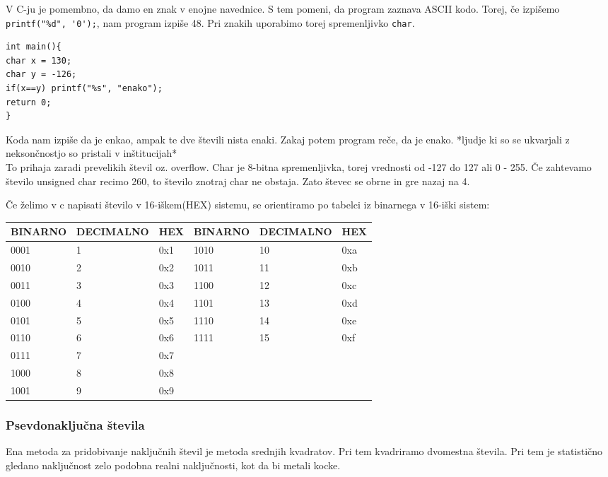 \documentclass[a4paper, 12pt]{article}
\begin{document}
V C-ju je pomembno, da damo en znak v enojne navednice. S tem pomeni, da program zaznava ASCII kodo. Torej, če izpišemo \lstinline|printf("%d", '0');|, nam program izpiše 48. Pri znakih uporabimo torej spremenljivko \lstinline|char|.

\begin{lstlisting}
int main(){
char x = 130;
char y = -126;
if(x==y) printf("%s", "enako");
return 0;
}
\end{lstlisting}
Koda nam izpiše da je enkao, ampak te dve števili nista enaki. Zakaj potem program reče, da je enako. *ljudje ki so se ukvarjali z neksončnostjo so pristali v inštitucijah*\\
To prihaja zaradi prevelikih števil oz. overflow. Char je 8-bitna spremenljivka, torej vrednosti od -127 do 127 ali 0 - 255. Če zahtevamo število unsigned char recimo 260, to število znotraj char ne obstaja. Zato števec se obrne in gre nazaj na 4.\

Če želimo v c napisati število v 16-iškem(HEX) sistemu, se orientiramo po tabelci iz binarnega v 16-iški sistem:

\begin{table}[!h]
	\centering
	\begin{tabular}{|l|l|l|l|l|l|}
		\hline BINARNO &DECIMALNO &HEX & BINARNO &DECIMALNO &HEX\\
		\hline 0001 & 1&0x1& 1010 & 10&0xa\\
		\hline 0010 & 2&0x2& 1011 & 11&0xb\\
		\hline 0011 & 3&0x3& 1100 & 12&0xc\\
		\hline 0100 & 4&0x4& 1101 & 13&0xd\\
		\hline 0101 & 5&0x5& 1110 & 14&0xe\\
		\hline 0110 & 6&0x6& 1111 & 15&0xf\\
		\hline 0111 & 7&0x7&&&\\
		\hline 1000 & 8&0x8&&&\\
		\hline 1001 & 9&0x9&&&\\  \hline
	\end{tabular}
\end{table}



\subsubsection{Psevdonaključna števila}
Ena metoda za pridobivanje naključnih števil je metoda srednjih kvadratov.
Pri tem kvadriramo dvomestna števila. Pri tem je statistično gledano naključnost zelo podobna realni naključnosti, kot da bi metali kocke.
\end{document}
